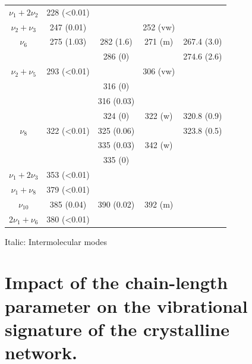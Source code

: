 \begin{table}[H]
\begin{center}
\begin{threeparttable}
\begin{tabular}{c c c c c}
 		  $\nu_{1}+ 2\nu_{2}$ & 228 (<0.01) & & & \\
 		  $\nu_{2}+\nu_{3}$& 247 (0.01) &  & 252 (vw) & \\
 		  $\nu_{6}$ & 275 (1.03) & 282 (1.6) & 271 (m) & 267.4 (3.0)\\
 		  	&  & 286 (0) &  & 274.6 (2.6)\\
 		  	$\nu_{2}+ \nu_{5}$ & 293 (<0.01) &  & 306 (vw) & \\
 		  	& & 316 (0) & & \\
 		   & & 316 (0.03) & & \\
 		    &  & 324 (0) & 322 (w) & 320.8 (0.9)\\
 		    $\nu_{8}$& 322 (<0.01) & 325 (0.06) & & 323.8 (0.5)\\
 		    &  & 335 (0.03) & 342 (w) & \\
 		    & & 335 (0) & & \\
 		    $\nu_{1}+ 2\nu_{3}$ & 353 (<0.01) & &  & \\	
 		    $\nu_{1}+ \nu_{8}$ & 379 (<0.01) & & & \\
 		    $\nu_{10}$ & 385 (0.04) & 390 (0.02) &  392 (m) & \\
 		    2$\nu_{1}+ \nu_{6}$ & 380 (<0.01) &  & & \\
 		    \bottomrule	    
 		  \end{tabular}
 		  
 		  \begin{tablenotes}
 		  	\item[] Italic: Intermolecular modes
 		  \end{tablenotes}
 		\end{threeparttable}
 	\end{center}
 \end{table}
 






\section{Impact of the chain-length parameter on the vibrational signature of the crystalline network.}

